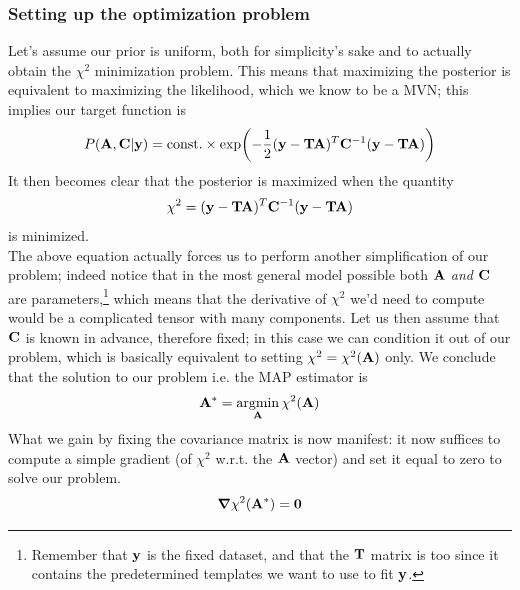 \documentclass[a4paper]{article}
\newcommand{\mat}[1]{\vb{#1}}
\DeclareMathOperator*{\argmin}{argmin}
\begin{document}
\subsubsection{Setting up the optimization problem}
Let's assume our prior is uniform, both for simplicity's sake and to actually obtain the $\chi^2$ minimization problem. This means that maximizing the posterior is equivalent to maximizing the likelihood, which we know to be a MVN; this implies our target function is
\begin{equation*}
    P(\vb{A}, \mat{C}|\vb{y}) = \text{const.} \times \exp(-\frac{1}{2}(\vb{y}-\mat{T}\vb{A})^T \mat{C}^{-1} (\vb{y}-\mat{T}\vb{A}) )
\end{equation*}
It then becomes clear that the posterior is maximized when the quantity
\begin{equation*}
    \chi^2 = (\vb{y}-\mat{T}\vb{A})^T \mat{C}^{-1} (\vb{y}-\mat{T}\vb{A})
\end{equation*}
is minimized.\\
The above equation actually forces us to perform another simplification of our problem; indeed notice that in the most general model possible both $\vb{A}$ \emph{and} $\mat{C}$ are parameters,\footnote{Remember that $\vb{y}$ is the fixed dataset, and that the $\mat{T}$ matrix is too since it contains the predetermined templates we want to use to fit $\vb{y}$.} which means that the derivative of $\chi^2$ we'd need to compute would be a complicated tensor with many components. Let us then assume that $\mat{C}$ is known in advance, therefore fixed; in this case we can condition it out of our problem, which is basically equivalent to setting $\chi^2 = \chi^2(\vb{A})$ only.
We conclude that the solution to our problem i.e. the MAP estimator is
\begin{equation*}
    \vb{A}^* = \argmin_{\vb{A}} \chi^2 (\vb{A})
\end{equation*}
What we gain by fixing the covariance matrix is now manifest: it now suffices to compute a simple gradient (of $\chi^2$ w.r.t. the $\vb{A}$ vector) and set it equal to zero to solve our problem.
\begin{equation*}
    \grad\chi^2(\vb{A}^*) = \vb{0}
\end{equation*}
\end{document}
